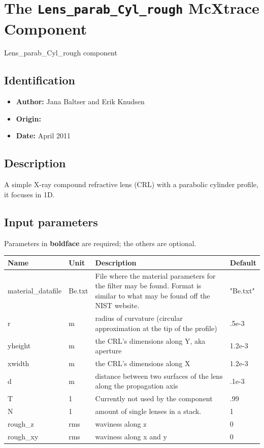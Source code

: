 \section{The \texttt{Lens\_parab\_Cyl\_rough} McXtrace Component}
Lens\_parab\_Cyl\_rough component

\subsection*{Identification}
\begin{itemize}
  \item \textbf{Author:} Jana Baltser and Erik Knudsen
  \item \textbf{Origin:} 
  \item \textbf{Date:} April 2011
\end{itemize}

\subsection*{Description}
A simple X-ray compound refractive lens (CRL) with a parabolic cylinder profile, it focuses in 1D.

\subsection*{Input parameters}
Parameters in \textbf{boldface} are required; the others are optional.

\begin{longtable}{p{}p{}p{}p{}}
\toprule
\textbf{Name} & \textbf{Unit} & \textbf{Description} & \textbf{Default} \\
\midrule
\endhead
material\_datafile & Be.txt & File where the material parameters for the filter may be found. Format is similar to what may be found off the NIST website. & "Be.txt" \\
r & m & radius of curvature (circular approximation at the tip of the profile) & .5e-3 \\
yheight & m & the CRL's dimensions along Y, aka aperture & 1.2e-3 \\
xwidth & m & the CRL's dimensions along X & 1.2e-3 \\
d & m & distance between two surfaces of the lens along the propagation axis & .1e-3 \\
T & 1 & Currently not used by the component & .99 \\
N & 1 & amount of single lenses in a stack. & 1 \\
rough\_z & rms & waviness along z & 0 \\
rough\_xy & rms & waviness along x and y & 0 \\
\bottomrule
\end{longtable}

